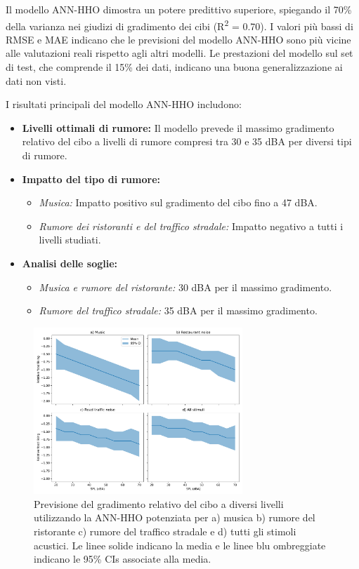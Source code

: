 Il modello ANN-HHO dimostra un potere predittivo superiore, spiegando il 70\% della varianza nei giudizi di gradimento dei cibi (R\textsuperscript{2} = 0.70). I valori più bassi di RMSE e MAE indicano che le previsioni del modello ANN-HHO sono più vicine alle valutazioni reali rispetto agli altri modelli. Le prestazioni del modello sul set di test, che comprende il 15\% dei dati, indicano una buona generalizzazione ai dati non visti.

I risultati principali del modello ANN-HHO includono:

\begin{itemize}
    \item \textbf{Livelli ottimali di rumore:} Il modello prevede il massimo gradimento relativo del cibo a livelli di rumore compresi tra 30 e 35 dBA per diversi tipi di rumore.
    
    \item \textbf{Impatto del tipo di rumore:}
    \begin{itemize}
        \item \textit{Musica:} Impatto positivo sul gradimento del cibo fino a 47 dBA.
        \item \textit{Rumore dei ristoranti e del traffico stradale:} Impatto negativo a tutti i livelli studiati.
    \end{itemize}
    
    \item \textbf{Analisi delle soglie:}
    \begin{itemize}
        \item \textit{Musica e rumore del ristorante:} 30 dBA per il massimo gradimento.
        \item \textit{Rumore del traffico stradale:} 35 dBA per il massimo gradimento.
    \end{itemize}
\end{itemize}

\begin{figure}[H]
      \centering
      \includegraphics[width=0.7\textwidth]{Chapters/Figures/foodprediction.pdf}
      \caption{\small Previsione del gradimento relativo del cibo a diversi livelli utilizzando la ANN-HHO potenziata per a) musica b) rumore del ristorante c) rumore del traffico stradale e d) tutti gli stimoli acustici. Le linee solide indicano la media e le linee blu ombreggiate indicano le 95{\%} CIs associate alla media.}
      \label{fig:foodprediction}
\end{figure}

